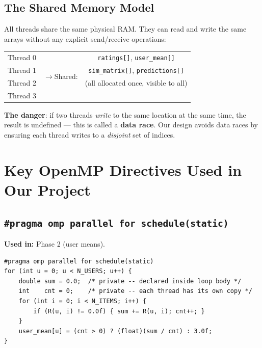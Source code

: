 \documentclass[12pt,a4paper]{article}
\begin{document}
\subsection{The Shared Memory Model}

All threads share the same physical RAM.  They can read and write the same
arrays without any explicit send/receive operations:

\begin{center}
\begin{tabular}{ccc}
Thread 0 & \multirow{4}{*}{$\longrightarrow$\quad Shared:} &
  \texttt{ratings[]}, \texttt{user\_mean[]} \\
Thread 1 & & \texttt{sim\_matrix[]}, \texttt{predictions[]} \\
Thread 2 & & (all allocated once, visible to all) \\
Thread 3 & & \\
\end{tabular}
\end{center}

\textbf{The danger}: if two threads \emph{write} to the same location at the
same time, the result is undefined — this is called a \textbf{data race}.  Our
design avoids data races by ensuring each thread writes to a \emph{disjoint}
set of indices.

\section{Key OpenMP Directives Used in Our Project}

\subsection{\texttt{\#pragma omp parallel for schedule(static)}}

\textbf{Used in:} Phase 2 (user means).

\begin{lstlisting}
#pragma omp parallel for schedule(static)
for (int u = 0; u < N_USERS; u++) {
    double sum = 0.0;  /* private -- declared inside loop body */
    int    cnt = 0;    /* private -- each thread has its own copy */
    for (int i = 0; i < N_ITEMS; i++) {
        if (R(u, i) != 0.0f) { sum += R(u, i); cnt++; }
    }
    user_mean[u] = (cnt > 0) ? (float)(sum / cnt) : 3.0f;
}
\end{lstlisting}
\end{document}

